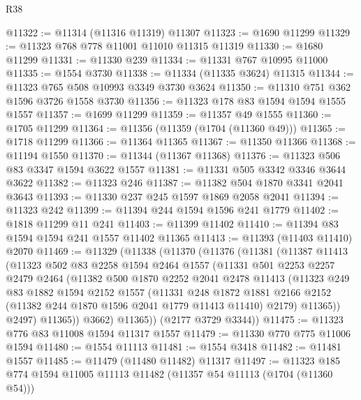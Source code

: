 \begin{lexlean}{R38}
\begin{coremodule}
@11322 := @11314 (@11316 @11319) @11307
@11323 := @1690 @11299
@11329 := @11323 @768 @778 @11001 @11010 @11315 @11319
@11330 := @1680 @11299
@11331 := @11330 @239
@11334 := @11331 @767 @10995 @11000
@11335 := @1554 @3730
@11338 := @11334 (@11335 @3624) @11315
@11344 := @11323 @765 @508 @10993 @3349 @3730 @3624
@11350 := @11310 @751 @362 @1596 @3726 @1558 @3730
@11356 := @11323 @178 @83 @1594 @1594 @1555 @1557
@11357 := @1699 @11299
@11359 := @11357 @49 @1555
@11360 := @1705 @11299
@11364 := @11356 (@11359 (@1704 (@11360 @49)))
@11365 := @1718 @11299
@11366 := @11364 @11365
@11367 := @11350 @11366
@11368 := @11194 @1550
@11370 := @11344 (@11367 @11368)
@11376 := @11323 @506 @83 @3347 @1594 @3622 @1557
@11381 := @11331 @505 @3342 @3346 @3644 @3622
@11382 := @11323 @246
@11387 := @11382 @504 @1870 @3341 @2041 @3643
@11393 := @11330 @237 @245 @1597 @1869 @2058 @2041
@11394 := @11323 @242
@11399 := @11394 @244 @1594 @1596 @241 @1779
@11402 := @1818 @11299 @11 @241
@11403 := @11399 @11402
@11410 := @11394 @83 @1594 @1594 @241 @1557 @11402 @11365
@11413 := @11393 (@11403 @11410) @2070
@11469 := @11329
    (@11338
      (@11370
        (@11376
          (@11381
            (@11387
              @11413
              (@11323
                @502
                @83
                @2258
                @1594
                @2464
                @1557
                (@11331
                  @501
                  @2253
                  @2257
                  @2479
                  @2464
                  (@11382
                    @500
                    @1870
                    @2252
                    @2041
                    @2478
                    @11413
                    (@11323
                      @249
                      @83
                      @1882
                      @1594
                      @2152
                      @1557
                      (@11331
                        @248
                        @1872
                        @1881
                        @2166
                        @2152
                        (@11382 @244 @1870 @1596 @2041 @1779 @11413 @11410)
                        @2179)
                      @11365))
                  @2497)
                @11365))
            @3662)
          @11365))
      (@2177 @3729 @3344))
@11475 := @11323 @776 @83 @11008 @1594 @11317 @1557
@11479 := @11330 @770 @775 @11006 @1594
@11480 := @1554 @11113
@11481 := @1554 @3418
@11482 := @11481 @1557
@11485 := @11479 (@11480 @11482) @11317
@11497 := @11323 @185 @774 @1594 @11005 @11113 @11482 (@11357 @54 @11113 (@1704 (@11360 @54)))

\end{coremodule}
\end{lexlean}
